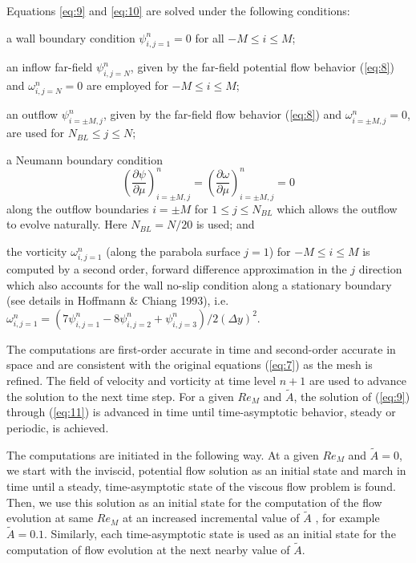 \documentclass{article}
\newcommand{\pd}{\partial}
\begin{document}
Equations \ref{eq:9} and \ref{eq:10} are solved under the following conditions:
\begin{inparaenum}
\item a wall boundary condition $\psi_{i,j=1}^n = 0$ for all $-M \le i \le M$;
\item an inflow far-field $\psi_{i,j=N}^n$, given by the far-field potential flow behavior (\ref{eq:8}) and $\omega_{i,j=N}^n = 0$ are employed for $-M \le i \le M$;
\item an outflow $\psi_{i=\pm M,j}^n$, given by the far-field flow behavior (\ref{eq:8}) and $\omega_{i=\pm M,j}^n = 0$, are used for $N_{BL} \le j \le N$;
\item a Neumann boundary condition 
\[\left(\frac{\pd \psi}{\pd \mu} \right)_{i = \pm M,j}^n = \left(\frac{\pd \omega}{\pd \mu} \right)_{i = \pm M,j}^n = 0
\] along the outflow boundaries $i = \pm M$ for $1 \le j \le N_{BL}$  which allows the outflow to evolve naturally. Here $N_{BL} = N/20$ is used; and
\item the vorticity $\omega_{i,j=1}^n$ (along the parabola surface $j=1$) for $-M \le i \le M$ is computed by a second order, forward difference approximation in the $j$ direction which also accounts for the wall no-slip condition along a stationary boundary (see details in Hoffmann \& Chiang 1993), i.e. $\omega_{i,j=1}^n = (7\psi_{i,j=1}^n - 8\psi_{i,j=2}^n + \psi_{i,j=3}^n) / 2(\Delta y)^2$.
\end{inparaenum}

The computations are first-order accurate in time and second-order accurate in space and are consistent with the original equations (\ref{eq:7}) as the mesh is refined. The field of velocity and vorticity at time level $n+1$ are used to advance the solution to the next time step. For a given $Re_M$ and $\tilde{A}$, the solution of (\ref{eq:9}) through (\ref{eq:11}) is advanced in time until time-asymptotic behavior, steady or periodic, is achieved.

The computations are initiated in the following way. At a given $Re_M$ and $\tilde{A} = 0$, we start with the inviscid, potential flow solution as an initial state and march in time until a steady, time-asymptotic state of the viscous flow problem is found. Then, we use this solution as an initial state for the computation of the flow evolution at same $Re_M$ at an increased incremental value of $\tilde{A}$ , for example $\tilde{A} = 0.1$. Similarly, each time-asymptotic state is used as an initial state for the computation of flow evolution at the next nearby value of $\tilde{A}$.
\end{document}
